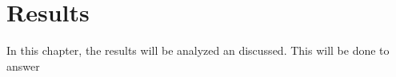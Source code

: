\chapter{Results}\label{ch:results}

In this chapter, the results will be analyzed an discussed. This will be done to answer 






